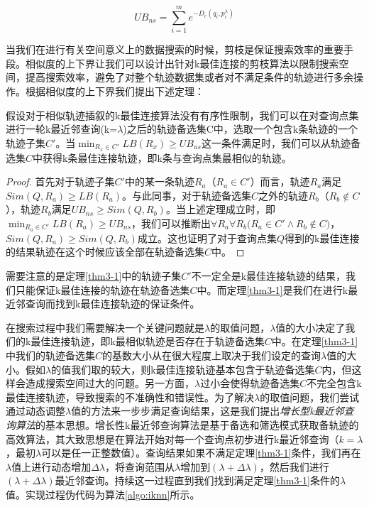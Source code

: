 \begin{equation}
	\label{eq3-7}
	UB_{ns} = \sum_{i=1}^{m}e^{-D_{e}(q_{i}, p_{i}^{\lambda})}
\end{equation}

当我们在进行有关空间意义上的数据搜索的时候，剪枝是保证搜索效率的重要手段。相似度的上下界让我们可以设计出针对k最佳连接的剪枝算法以限制搜索空间，提高搜索效率，避免了对整个轨迹数据集或者对不满足条件的轨迹进行多余操作。根据相似度的上下界我们提出下述定理：
\\

\begin{thm}[相似度上下界]
	\label{thm3-1}
	假设对于相似轨迹插叙的k最佳连接算法没有有序性限制，我们可以在对查询点集进行一轮k最近邻查询(k=$\lambda$)之后的轨迹备选集C中，选取一个包含k条轨迹的一个轨迹子集$C'$。当$\min_{R_{x}\in C'}{LB(R_{x})}\geq UB_{us}$这一条件满足时，我们可以从轨迹备选集$C$中获得k条最佳连接轨迹，即k条与查询点集最相似的轨迹。
	\begin{proof}
	首先对于轨迹子集$C'$中的某一条轨迹$R_{a}$（$R_{a} \in C'$）而言，轨迹$R_{a}$满足$Sim(Q,R_{a}) \geq LB(R_{a})$。与此同事，对于轨迹备选集$C$之外的轨迹$R_{b}$（$R_{b} \notin C$），轨迹$R_{b}$满足$UB_{ns} \geq Sim(Q,R_{b})$。当上述定理成立时，即$\min_{R_{a}\in C'}{LB(R_{a})}\geq UB_{ns}$，我们可以推断出$\forall R_{a}\forall R_{b} \big( R_{a} \in C' \wedge R_{b} \notin C \big)$，$Sim(Q,R_{a}) \geq Sim(Q,R_{b})$成立。这也证明了对于查询点集$Q$得到的k最佳连接的结果轨迹在这个时候应该全部在轨迹备选集$C$中。
	\end{proof}
\end{thm}

需要注意的是定理\ref{thm3-1}中的轨迹子集$C'$不一定全是k最佳连接轨迹的结果，我们只能保证k最佳连接的轨迹在轨迹备选集$C$中。而定理\ref{thm3-1}是我们在进行k最近邻查询而找到k最佳连接轨迹的保证条件。

在搜索过程中我们需要解决一个关键问题就是$\lambda$的取值问题，$\lambda$值的大小决定了我们的k最佳连接轨迹，即k最相似轨迹是否存在于轨迹备选集$C$中。在定理\ref{thm3-1}中我们的轨迹备选集$C$的基数大小从在很大程度上取决于我们设定的查询$\lambda$值的大小。假如$\lambda$的值我们取的较大，则k最佳连接轨迹基本包含于轨迹备选集$C$内，但这样会造成搜索空间过大的问题。另一方面，$\lambda$过小会使得轨迹备选集$C$不完全包含k最佳连接轨迹，导致搜索的不准确性和错误性。为了解决$\lambda$的取值问题，我们尝试通过动态调整$\lambda$值的方法来一步步满足查询结果，这是我们提出\emph{增长型k最近邻查询算法}的基本思想。增长性k最近邻查询算法是基于备选和筛选模式获取备轨迹的高效算法，其大致思想是在算法开始对每一个查询点初步进行k最近邻查询（$k=\lambda$，最初$\lambda$可以是任一正整数值）。查询结果如果不满足定理\ref{thm3-1}条件，我们再在$\lambda$值上进行动态增加$\Delta\lambda$，将查询范围从$\lambda$增加到$(\lambda+\Delta\lambda)$，然后我们进行$(\lambda+\Delta\lambda)$最近邻查询。持续这一过程直到我们找到满足定理\ref{thm3-1}条件的$\lambda$值。实现过程伪代码为算法\ref{algo:iknn}所示。

